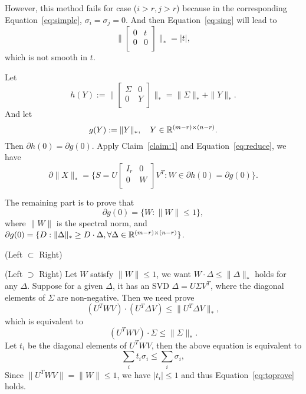 However,
this method fails for case ($i>r, j>r$)
because in the corresponding Equation~\eqref{eq:simple},
$\sigma_i=\sigma_j=0$.
And then Equation~\eqref{eq:sing} will lead to
\begin{equation}
    \bigg\|\begin{bmatrix}
        0 & t \\
        0 & 0 \\
    \end{bmatrix}\bigg\|_*=|t|,
\end{equation}
which is not smooth in $t$.

Let
\begin{equation}
    h(Y):=\bigg\|\begin{bmatrix}
            \Sigma & 0 \\
            0      & Y \\
        \end{bmatrix}\bigg\|_*
        =\|\Sigma\|_*+\|Y\|_*.
\end{equation}
And let
\begin{equation}
    g(Y):=\|Y\|_*,\quad Y\in{\mathbb{R}}^{(m-r)\times(n-r)}.
\end{equation}
Then $\partial h(0)=\partial g(0)$.
Apply Claim~\ref{claim:1} and Equation~\eqref{eq:reduce},
we have
\begin{equation}
    \partial \|X\|_*=\bigg\{
        S=U\begin{bmatrix}
            I_r & 0 \\
            0   & W \\
        \end{bmatrix}V^T:W\in\partial h(0)=\partial g(0)
        \bigg\}.
\end{equation}

The remaining part is to prove that
\begin{equation}
    \partial g(0)=\{W:\|W\|\le1\},
\end{equation}
where $\|W\|$ is the spectral norm, and
$\partial g(0)=\{D:\|\Delta\|_*\ge D\cdot\Delta,
\forall\Delta\in{\mathbb{R}}^{(m-r)\times(n-r)}\}$.

(Left $\subset$ Right)

(Left $\supset$ Right)
Let $W$ satisfy $\|W\|\le1$,
we want $W\cdot\Delta\le\|\Delta\|_*$ holds for any $\Delta$.
Suppose for a given $\Delta$,
it has an SVD $\Delta=U\Sigma V^T$,
where the diagonal elements of $\Sigma$ are non-negative.
Then we need prove
\begin{equation}
    (U^TWV)\cdot(U^T\Delta V)\le\|U^T\Delta V\|_*,
\end{equation}
which is equivalent to
\begin{equation}
    (U^TWV)\cdot\Sigma\le\|\Sigma\|_*.
\end{equation}
Let $t_i$ be the diagonal elements of $U^TWV$,
then the above equation is equivalent to
\begin{equation}\label{eq:toprove}
    \sum_i t_i \sigma_i \le\sum_i \sigma_i,
\end{equation}
Since $\|U^TWV\|=\|W\|\le1$,
we have $|t_i|\le1$ and thus Equation~\eqref{eq:toprove} holds.
